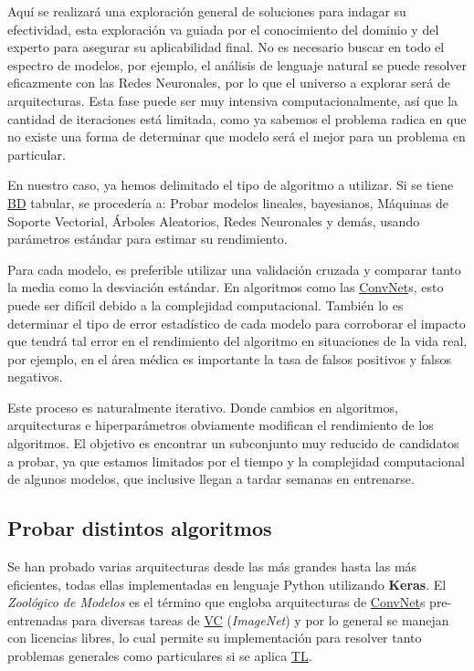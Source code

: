 
Aquí se realizará una exploración general de soluciones para indagar su
efectividad, esta exploración va guiada por el conocimiento del dominio y del
experto para asegurar su aplicabilidad final. No es necesario buscar en todo el
espectro de modelos, por ejemplo, el análisis de lenguaje natural se puede
resolver eficazmente con las Redes Neuronales, por lo que el universo a explorar
será de arquitecturas. Esta fase puede ser muy intensiva computacionalmente, así
que la cantidad de iteraciones está limitada, como ya sabemos el problema radica
en que no existe una forma de determinar que modelo será el mejor para un
problema en particular.

En nuestro caso, ya hemos delimitado el tipo de algoritmo a utilizar. Si se
tiene \hyperlink{abbr}{BD} tabular, se procedería a: Probar modelos lineales,
bayesianos, Máquinas de Soporte Vectorial, Árboles Aleatorios, Redes Neuronales
y demás, usando parámetros estándar para estimar su rendimiento.

Para cada modelo, es preferible utilizar una validación cruzada y comparar
tanto la media como la desviación estándar. En algoritmos como las \hyperlink{abbr}{ConvNet}s,
esto puede ser difícil debido a la complejidad computacional. También
lo es determinar el tipo de error estadístico de cada modelo para corroborar el
impacto que tendrá tal error en el rendimiento del algoritmo en situaciones de
la vida real, por ejemplo, en el área médica es importante la tasa de falsos
positivos y falsos negativos.

Este proceso es naturalmente iterativo. Donde cambios en algoritmos,
arquitecturas e hiperparámetros obviamente modifican el rendimiento de los
algoritmos. El objetivo es encontrar un subconjunto muy reducido de candidatos a
probar, ya que estamos limitados por el tiempo y la complejidad computacional de
algunos modelos, que inclusive llegan a tardar semanas en entrenarse.

\subsection{Probar distintos algoritmos}

Se han probado varias arquitecturas desde las más grandes hasta las más
eficientes, todas ellas implementadas en lenguaje Python utilizando
\textbf{Keras}. El \emph{Zoológico de Modelos} es el término que engloba
arquitecturas de \hyperlink{abbr}{ConvNet}s pre-entrenadas para diversas tareas
de \hyperlink{abbr}{VC} (\emph{ImageNet}) y por lo general se manejan con
licencias libres, lo cual permite su implementación para resolver tanto
problemas generales como particulares si se aplica \hyperlink{abbr}{TL}.

